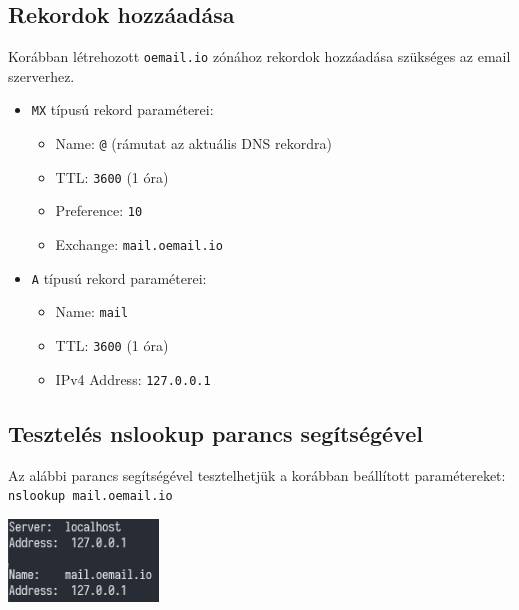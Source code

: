 \subsection{Rekordok hozzáadása}
\begin{flushleft}
    Korábban létrehozott \verb|oemail.io| zónához rekordok hozzáadása szükséges az email szerverhez.
\end{flushleft}
\begin{itemize}
    \item \verb|MX| típusú rekord paraméterei:
    \begin{itemize}
        \item Name: \verb|@| (rámutat az aktuális DNS rekordra)
        \item TTL: \verb|3600| (1 óra)
        \item Preference: \verb|10|
        \item Exchange: \verb|mail.oemail.io|
    \end{itemize}
    \item \verb|A| típusú rekord paraméterei:
    \begin{itemize}
        \item Name: \verb|mail|
        \item TTL: \verb|3600| (1 óra)
        \item IPv4 Address: \verb|127.0.0.1|
    \end{itemize}
\end{itemize}
\subsection{Tesztelés nslookup parancs segítségével}
Az alábbi parancs segítségével tesztelhetjük a korábban beállított paramétereket: \verb|nslookup mail.oemail.io|
\begin{center}
    \includegraphics[width=4cm]{dnsdom.png}
\end{center}
